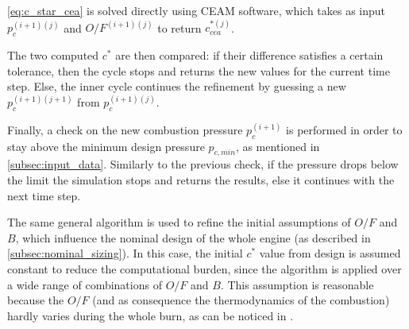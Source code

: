 \autoref{eq:c_star_cea} is solved directly using CEAM software, which takes as input $p_c ^ {(i+1)(j)}$ and $O/F ^ {(i+1)(j)}$ to return $c_{cea}^{*(j)}$.

The two computed $c^*$ are then compared: if their difference satisfies a certain tolerance, then the cycle stops and returns the new values for the current time step. Else, the inner cycle continues the refinement by guessing a new $p_c ^ {(i+1)(j+1)}$ from $p_c ^ {(i+1)(j)}$.

Finally, a check on the new combustion pressure $p_c ^ {(i+1)}$ is performed in order to stay above the minimum design pressure $p_{c,min}$, as mentioned in \autoref{subsec:input_data}. Similarly to the previous check, if the pressure drops below the limit the simulation stops and returns the results, else it continues with the next time step.

\vspace*{3mm}

The same general algorithm is used to refine the initial assumptions of $O/F$ and $B$, which influence the nominal design of the whole engine (as described in \autoref{subsec:nominal_sizing}).
In this case, the initial $c^*$ value from design is assumed constant to reduce the computational burden, since the algorithm is applied over a wide range of combinations of $O/F$ and $B$. This assumption is reasonable because the $O/F$ (and as consequence the thermodynamics of the combustion) hardly varies during the whole burn, as can be noticed in \mref.